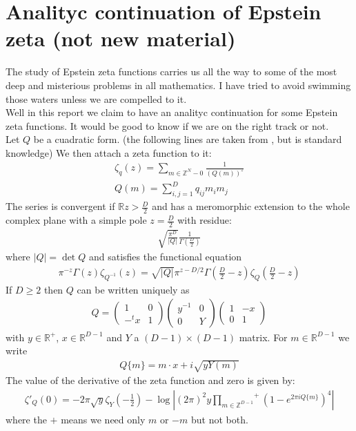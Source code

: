 \documentclass[12pt]{article}
\newcommand{\mat}[1]{\left(\begin{matrix}#1\end{matrix}\right)}
\def\RR{\mathbb R}
\def\ZZ{\mathbb Z}
\begin{document}
\section{Analityc continuation of Epstein zeta (not new material)}
The study of Epstein zeta functions carries us all the way to some of the most deep and misterious problems in all mathematics. I have tried to avoid swimming those waters unless we are compelled to it.\\
Well in this report we claim to have an analityc continuation for some Epstein zeta functions. It would be good to know if we are on the right track or not.\\
Let $Q$ be a cuadratic form. (the following lines are taken from \cite{DukIma}, but is standard knowledge) We then attach a zeta function to it:
\begin{gather}
\zeta_q(z)=\sum_{m\in\ZZ^N-{0}}\frac{1}{(Q(m))^z}\\
Q(m)=\sum_{i,j=1}^D q_{ij}m_im_j
\end{gather}
The series is convergent if $\RR z>\frac{D}{2}$ and has a meromorphic extension to the whole complex plane with a simple pole $z=\frac{D}{2}$ with residue:
\begin{gather}
\sqrt{\frac{\pi^D}{|Q|}}\frac{1}{\Gamma\left(\frac{D}{2}\right)}
\end{gather}
where $|Q|=\det Q$ and satisfies the functional equation
\begin{gather}
\pi^{-z}\Gamma(z)\zeta_{Q^{-1}}(z)=\sqrt{|Q|}\pi^{z-D/2}\Gamma\left(\frac{D}{2}-z\right)\zeta_Q\left(\frac{D}{2}-z\right)
\end{gather}
If $D\geq 2$ then $Q$ can be written uniquely as
\begin{gather}
Q=\mat{1 & 0\\ -^tx & 1}\mat{y^{-1} & 0\\ 0 & Y}\mat{1 & -x\\ 0 & 1}
\end{gather}
with $y\in\RR^+$, $x\in\RR^{D-1}$ and $Y$ a $(D-1)\times (D-1)$ matrix. For $m\in\RR^{D-1}$ we write
\begin{gather}
Q\{m\}=m\cdot x+i\sqrt{yY(m)}
\end{gather}
The value of the derivative of the zeta function and zero is given by:
\begin{gather}
\zeta'_Q(0)=-2\pi\sqrt{y}\zeta_Y\left(-\frac{1}{2}\right)- \log\left|(2\pi)^2y{\prod_{m\in\ZZ^{D-1}}}^+\left(1-e^{2\pi iQ\{m\}}\right)^4\right|
\end{gather}
where the $+$ means we need only $m$ or $-m$ but not both.
\end{document}
